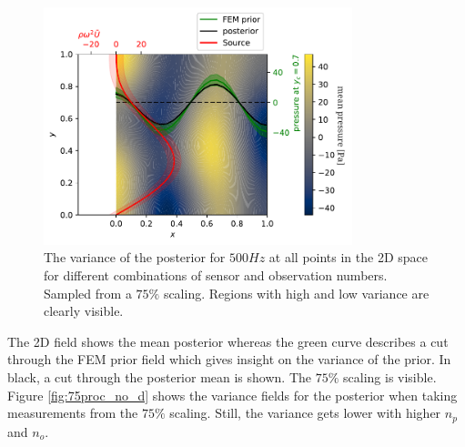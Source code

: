 \documentclass[%
  a4paper,oneside,%
  11pt,%
  smallchapters,
  style=printdev,
  extramargin,
  green,%
  rgb, <cmyk>
  ]{tubsbook}
\begin{document}
\begin{figure}[!ht]
\includegraphics[width=0.8\textwidth]{../../Python/Results/2D/75procent_no_d/SolutionCustomPosterior.pdf}
\centering
\caption[Source, prior and posterior for the 2D example at 500Hz]{The variance of the posterior for $500Hz$ at all points in the 2D space for different combinations of sensor and observation numbers. Sampled from a $75\%$ scaling. Regions with high and low variance are clearly visible.}
\end{figure}
\label{fig:75proc_no_d_overview}

The 2D field shows the mean posterior whereas the green curve describes a cut through the FEM prior field which gives insight on the variance of the prior. In black, a cut through the posterior mean is shown. The $75\%$ scaling is visible.
%
Figure \ref{fig:75proc_no_d} shows the variance fields for the posterior when taking measurements from the $75\%$ scaling. Still, the variance gets lower with higher $n_p$ and $n_o$.
\end{document}
